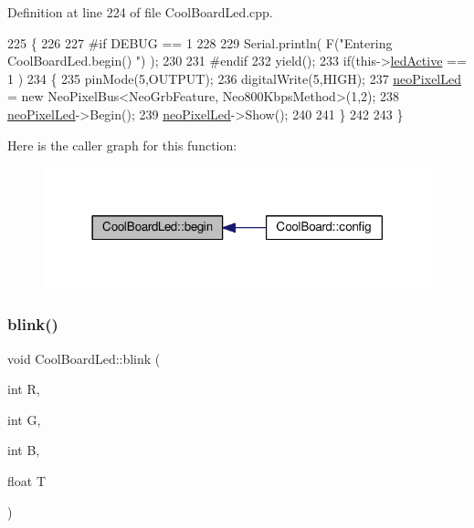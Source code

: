 Definition at line 224 of file Cool\+Board\+Led.\+cpp.


\begin{DoxyCode}
225 \{
226 
227 \textcolor{preprocessor}{#if DEBUG == 1}
228 
229     Serial.println( F(\textcolor{stringliteral}{"Entering CoolBoardLed.begin() "}) );
230 
231 \textcolor{preprocessor}{#endif}
232     yield();
233     \textcolor{keywordflow}{if}(this->\hyperlink{class_cool_board_led_aadd04d2ecf123247718d77f42fba7f08}{ledActive} == 1 )
234     \{
235         pinMode(5,OUTPUT);
236         digitalWrite(5,HIGH);
237         \hyperlink{class_cool_board_led_ac2c13fa462a010cd9242bf297c013923}{neoPixelLed} = \textcolor{keyword}{new} NeoPixelBus<NeoGrbFeature, Neo800KbpsMethod>(1,2); 
238         \hyperlink{class_cool_board_led_ac2c13fa462a010cd9242bf297c013923}{neoPixelLed}->Begin();
239         \hyperlink{class_cool_board_led_ac2c13fa462a010cd9242bf297c013923}{neoPixelLed}->Show();
240 
241     \}
242 
243 \} 
\end{DoxyCode}
Here is the caller graph for this function\+:\nopagebreak
\begin{figure}[H]
\begin{center}
\leavevmode
\includegraphics[width=318pt]{de/dc0/class_cool_board_led_ae3cbde8affcc6f011cbd698c8ef911f6_icgraph}
\end{center}
\end{figure}
\mbox{\label{class_cool_board_led_a96e1ea13003eee34c9dbcef340404426}} 
\subsubsection{\texorpdfstring{blink()}{blink()}}
{\footnotesize\ttfamily void Cool\+Board\+Led\+::blink (\begin{DoxyParamCaption}\item[{int}]{R,  }\item[{int}]{G,  }\item[{int}]{B,  }\item[{float}]{T }\end{DoxyParamCaption})}

